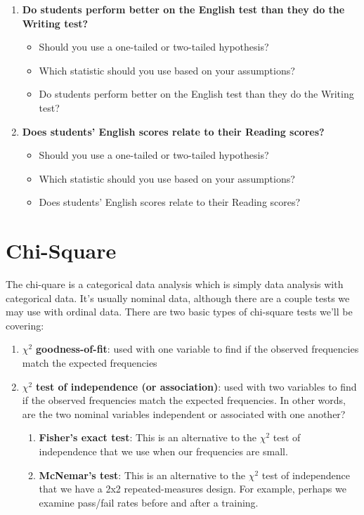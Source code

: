 \documentclass[
]{book}
\begin{document}
\begin{enumerate}
\def\labelenumi{\arabic{enumi}.}
\item
  \textbf{Do students perform better on the English test than they do the Writing test?}

  \begin{itemize}
  \item
    Should you use a one-tailed or two-tailed hypothesis?
  \item
    Which statistic should you use based on your assumptions?
  \item
    Do students perform better on the English test than they do the Writing test?
  \end{itemize}
\item
  \textbf{Does students' English scores relate to their Reading scores?}

  \begin{itemize}
  \item
    Should you use a one-tailed or two-tailed hypothesis?
  \item
    Which statistic should you use based on your assumptions?
  \item
    Does students' English scores relate to their Reading scores?
  \end{itemize}
\end{enumerate}

\hypertarget{chi-square}{%
\chapter{Chi-Square}\label{chi-square}}

The chi-quare is a categorical data analysis which is simply data analysis with categorical data. It's usually nominal data, although there are a couple tests we may use with ordinal data. There are two basic types of chi-square tests we'll be covering:

\begin{enumerate}
\def\labelenumi{\arabic{enumi}.}
\item
  \(\chi^2\) \textbf{goodness-of-fit}: used with one variable to find if the observed frequencies match the expected frequencies
\item
  \(\chi^2\) \textbf{test of independence (or association)}: used with two variables to find if the observed frequencies match the expected frequencies. In other words, are the two nominal variables independent or associated with one another?

  \begin{enumerate}
  \def\labelenumii{\arabic{enumii}.}
  \item
    \textbf{Fisher's exact test}: This is an alternative to the \(\chi^2\) test of independence that we use when our frequencies are small.
  \item
    \textbf{McNemar's test}: This is an alternative to the \(\chi^2\) test of independence that we have a 2x2 repeated-measures design. For example, perhaps we examine pass/fail rates before and after a training.
  \end{enumerate}
\end{enumerate}
\end{document}
